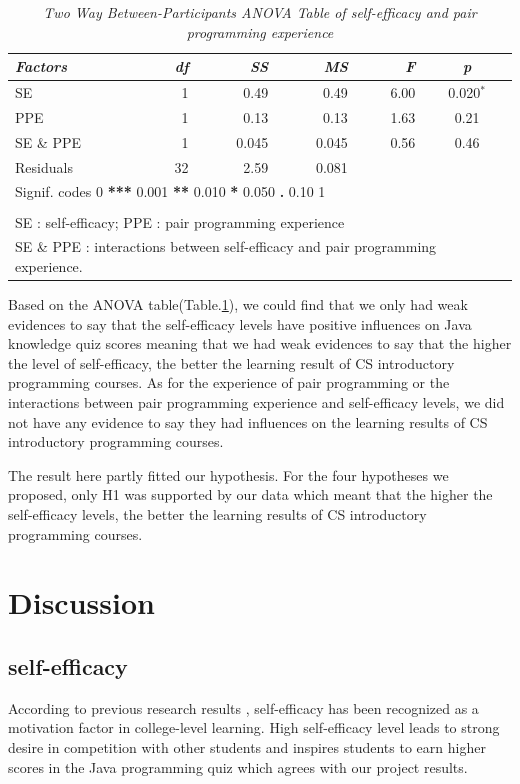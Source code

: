 \documentclass{sigchi}
\begin{document}
\begin{table}[ht]
\begin{center}
\caption{ \textit{Two Way Between-Participants ANOVA Table of self-efficacy and pair programming experience}}
\label{table1}
\begin{tabular}{lrrrrc}
  \hline
\textit{ Factors} & \textit{df} & \textit{SS}& \textit{MS} & \textit{F} & \textit{p} \\ 
  \hline
SE      &1	&0.49	&0.49	 &6.00	  &0.020$^*$  \\
PPE         &1	&0.13	&0.13	 &1.63	  &0.21      \\ 
 SE \& PPE          &1	&0.045	&0.045	&0.56	&0.46  \\
  Residuals  	&32	&2.59 & 0.081 &  &  \\ 
   \hline
   \hline
\multicolumn{6}{l}{Signif. codes    0 \textbf{ *** } 0.001 \textbf{ ** } 0.010\textbf{ * } 0.050 \textbf{ . } 0.10 \textbf{   } 1} \\ 
\hline \\
\multicolumn{6}{l}{\small SE : self-efficacy; PPE :  pair programming experience} \\
\multicolumn{6}{l}{\small SE \& PPE  : interactions between self-efficacy and pair programming experience.}
\end{tabular}
\end{center}
\end{table}

Based on the ANOVA table(Table.\ref{table1}), we could find that we only had weak evidences to say that the self-efficacy levels have positive influences on Java knowledge quiz scores meaning that we had weak evidences to say that the higher the level of self-efficacy, the better the learning result of CS introductory programming courses. As for the experience of pair programming or the interactions between pair programming experience and self-efficacy levels, we did not have any evidence to say they had influences on the learning results of CS introductory programming courses.

The result here partly fitted our hypothesis. For the four hypotheses we proposed, only H1 was supported by our data which meant that the higher the self-efficacy levels, the better the learning results of CS introductory programming courses. 

\section{Discussion}
\subsection{self-efficacy}
According to previous research results \cite{ramalingam2004self}, self-efficacy has been recognized as a motivation factor in college-level learning. High self-efficacy level leads to strong desire in competition with other students and inspires students to earn higher scores in the Java programming quiz which agrees with our project results. 
\end{document}
